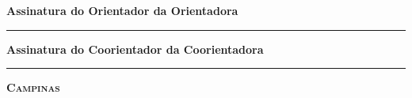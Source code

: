 \noindent
{\small \bfseries
\noindent
Assinatura
\ifx\femaleOrientador\undefined
do Orientador
\else
da Orientadora
\fi

\vspace{.5cm}
\noindent
\rule[1pt]{7cm}{.5pt}  %
}
\vspace{.5cm}


\ifx\coorientador\undefined
\else
{\small \bfseries
\noindent
Assinatura
\ifx\femaleCoorientador\undefined
do Coorientador
\else
da Coorientadora
\fi

\vspace{.5cm}
\noindent
\rule[1pt]{7cm}{.5pt}  %
}
\fi
\vfill
\begin{center}
  {\small \scshape \bfseries Campinas \\ \ano}
\end{center}
